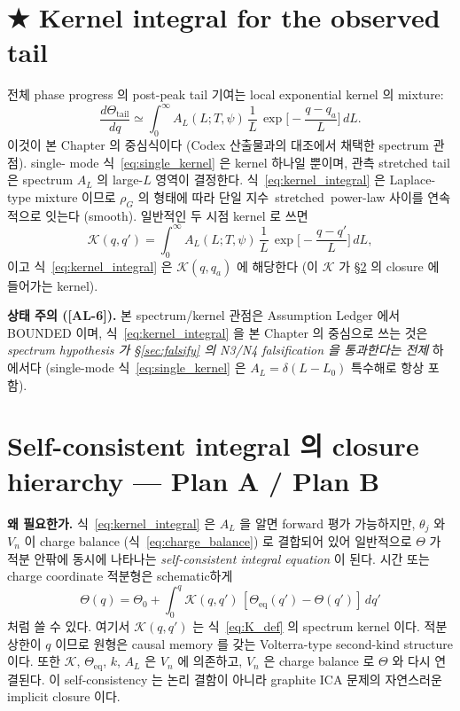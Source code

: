 \documentclass[11pt,a4paper]{article}
\newcommand{\eq}{\mathrm{eq}}
\newcommand{\AL}[1]{\textsf{[AL-#1]}}
\begin{document}
\section{★ Kernel integral for the observed tail}\label{sec:kernel}
전체 phase progress 의 post-peak tail 기여는 local exponential kernel 의 mixture:
\begin{equation}
\boxed{\;\frac{d\Theta_\mathrm{tail}}{dq}\simeq\int_0^\infty A_L(L;T,\psi)\,\frac1L\,
\exp\!\Big[-\frac{q-q_a}{L}\Big]\,dL.\;}
\label{eq:kernel_integral}
\end{equation}
이것이 본 Chapter 의 중심식이다 (Codex 산출물과의 대조에서 채택한 spectrum 관점). single-
mode 식~\eqref{eq:single_kernel} 은 kernel 하나일 뿐이며, 관측 stretched tail 은 spectrum
$A_L$ 의 large-$L$ 영역이 결정한다. 식~\eqref{eq:kernel_integral} 은 Laplace-type mixture
이므로 $\rho_G$ 의 형태에 따라 단일 지수~stretched~power-law 사이를 연속적으로 잇는다
(smooth). 일반적인 두 시점 kernel 로 쓰면
\begin{equation}
\mathcal K(q,q')=\int_0^\infty A_L(L;T,\psi)\,\frac1L\,\exp\!\Big[-\frac{q-q'}{L}\Big]\,dL,
\label{eq:K_def}
\end{equation}
이고 식~\eqref{eq:kernel_integral} 은 $\mathcal K(q,q_a)$ 에 해당한다 (이 $\mathcal K$ 가
\S\ref{sec:closure} 의 closure 에 들어가는 kernel).

\textbf{상태 주의 (\AL{6}).} 본 spectrum/kernel 관점은 Assumption Ledger 에서 BOUNDED
이며, 식~\eqref{eq:kernel_integral} 을 본 Chapter 의 중심으로 쓰는 것은 \emph{spectrum
hypothesis 가 \S\ref{sec:falsify} 의 N3/N4 falsification 을 통과한다는 전제} 하에서다
(single-mode 식~\eqref{eq:single_kernel} 은 $A_L=\delta(L-L_0)$ 특수해로 항상 포함).

\section{Self-consistent integral 의 closure hierarchy — Plan A / Plan B}\label{sec:closure}
\textbf{왜 필요한가.} 식~\eqref{eq:kernel_integral} 은 $A_L$ 을 알면 forward 평가 가능하지만,
$\theta_j$ 와 $V_n$ 이 charge balance (식~\eqref{eq:charge_balance}) 로 결합되어 있어 일반적으로
$\Theta$ 가 적분 안팎에 동시에 나타나는 \emph{self-consistent integral equation} 이 된다.
시간 또는 charge coordinate 적분형은 schematic하게
\begin{equation}
\Theta(q)=\Theta_0+\int_0^q \mathcal K(q,q')\,[\Theta_\eq(q')-\Theta(q')]\,dq'
\label{eq:volterra_self}
\end{equation}
처럼 쓸 수 있다. 여기서 $\mathcal K(q,q')$ 는 식~\eqref{eq:K_def} 의 spectrum kernel 이다.
적분 상한이 $q$ 이므로 원형은 causal memory 를 갖는 Volterra-type second-kind structure 이다.
또한 $\mathcal K$, $\Theta_\eq$, $k$, $A_L$ 은 $V_n$ 에 의존하고, $V_n$ 은 charge balance 로
$\Theta$ 와 다시 연결된다. 이 self-consistency 는 논리 결함이 아니라 graphite ICA 문제의
자연스러운 implicit closure 이다.
\end{document}
